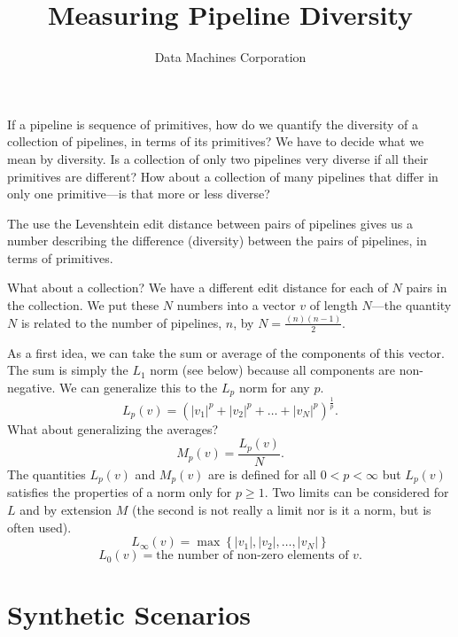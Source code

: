\documentclass{article}
\title{Measuring Pipeline Diversity}
\author{Data Machines Corporation}
\begin{document}
\maketitle

If a pipeline is sequence of primitives, how do we quantify the
diversity of a collection of pipelines, in terms of its primitives?
We have to decide what we mean by diversity.  Is a collection of only
two pipelines very diverse if all their primitives are different?  How
about a collection of many pipelines that differ in only one
primitive---is that more or less diverse?

The use the Levenshtein edit distance between pairs of pipelines gives
us a number describing the difference (diversity) between the pairs of
pipelines, in terms of primitives.

What about a collection?  We have a different edit distance for each
of $N$ pairs in the collection.  We put these $N$ numbers into a
vector $v$ of length $N$---the quantity $N$ is related to the number
of pipelines, $n$, by $N = \frac{(n)(n-1)}{2}$.

As a first idea, we can take the sum or average of the components of
this vector.  The sum is simply the $L_1$ norm (see below) because all
components are non-negative.  We can generalize this to the $L_p$ norm
for any $p$.
$$L_p(v) = \left(|v_1|^p + |v_2|^p + \dots +
|v_N|^p\right)^\frac{1}{p}.$$ What about generalizing the averages?
$$M_p(v) = \frac{L_p(v)}{N}.$$ The quantities $L_p(v)$ and $M_p(v)$
are is defined for all $0 < p < \infty$ but $L_p(v)$ satisfies the
properties of a norm only for $p \geq 1$. Two limits can be considered
for $L$ and by extension $M$ (the second is not really a limit nor is
it a norm, but is often used).
$$L_\infty(v) = \max\left\{|v_1|, |v_2|, \dots, |v_N|\right\}$$
$$L_0(v) = \mbox{the number of non-zero elements of $v$}.$$

\newpage
\section{Synthetic Scenarios}
\end{document}
